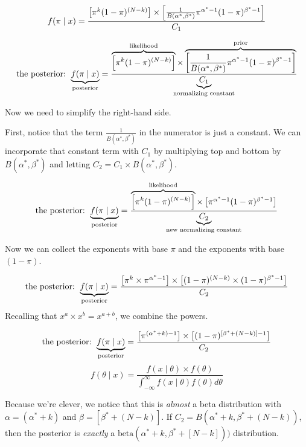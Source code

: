 \documentclass[
]{book}
\begin{document}
\[
\displaystyle f(\pi \mid x) = \frac{\left[ \pi^{k} (1 - \pi)^{(N - k) }\right] \times \left[ \frac{1}{B(\alpha^*, \beta^*)} \pi^{\alpha^* - 1}(1 - \pi)^{\beta^* - 1} \right]}{ C_1} \\
\]

\[
\text{the posterior: } \displaystyle \underbrace{f(\pi \mid x)}_{\text{posterior}} = \frac{\overbrace{\left[ \pi^{k} (1 - \pi)^{(N - k) }\right] }^{\text{likelihood}} \times \overbrace{ \left[ \frac{1}{B(\alpha^*, \beta^*)} \pi^{\alpha^* - 1}(1 - \pi)^{\beta^* - 1} \right] }^{\text{prior}}}{\displaystyle \underbrace{C_1}_{\text{normalizing constant}}} \\
\]

Now we need to simplify the right-hand side.

First, notice that the term \(\frac{1}{B(\alpha^*, \beta^*)}\) in the
numerator is just a constant. We can incorporate that constant term with
\(C_1\) by multiplying top and bottom by \(B(\alpha^*, \beta^*)\) and
letting \(C_2 = C_1 \times B(\alpha^*, \beta^*)\).

\[
\text{the posterior: } \displaystyle \underbrace{f(\pi \mid x)}_{\text{posterior}} = \frac{\overbrace{\left[ \pi^{k} (1 - \pi)^{(N - k) }\right] }^{\text{likelihood}} \times  \left[ \pi^{\alpha^* - 1}(1 - \pi)^{\beta^* - 1} \right] }{\displaystyle \underbrace{C_2}_{\text{new normalizing constant}}} \\
\]

Now we can collect the exponents with base \(\pi\) and the exponents
with base \((1 - \pi)\).

\[
\text{the posterior: } \displaystyle \underbrace{f(\pi \mid x)}_{\text{posterior}} = \frac{\left[ \pi^{k} \times \pi^{\alpha^* - 1} \right] \times  \left[ (1 - \pi)^{(N - k) } \times (1 - \pi)^{\beta^* - 1} \right] }{ C_2} \\
\] Recalling that \(x^a \times x^b = x^{a + b}\), we combine the powers.

\[
\text{the posterior: } \displaystyle \underbrace{f(\pi \mid x)}_{\text{posterior}} = \frac{\left[ \pi^{(\alpha^* + k) - 1} \right] \times  \left[ (1 - \pi)^{[\beta^* + (N - k)] - 1} \right] }{ C_2} \\
\] \[
\displaystyle f(\theta \mid x) = \frac{f(x \mid \theta) \times f(\theta)}{\displaystyle \int_{-\infty}^\infty f(x \mid \theta)f(\theta) d\theta}
\]

Because we're clever, we notice that this is \emph{almost} a beta
distribution with \(\alpha = (\alpha^* + k)\) and
\(\beta = [\beta^* + (N - k)]\). If
\(C_2 = B(\alpha^* + k, \beta^* + (N - k))\), then the posterior is
\emph{exactly} a \(\text{beta}(\alpha^* + k, \beta^* + [N - k]))\)
distribution.
\end{document}
